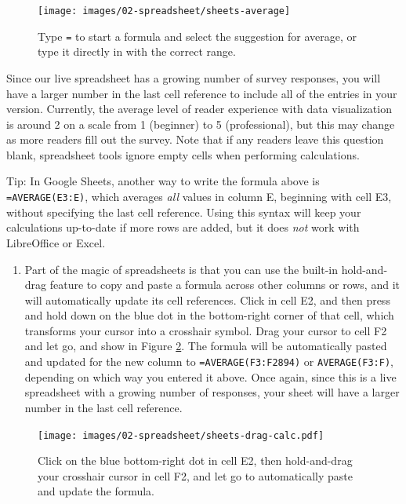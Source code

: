 \documentclass[
  english,
]{book}
\providecommand{\tightlist}{%
  \setlength{\itemsep}{0pt}\setlength{\parskip}{0pt}}
\begin{document}
\begin{figure}
\texttt{[image: images/02-spreadsheet/sheets-average]} \caption{Type \texttt{=} to start a formula and select the suggestion for average, or type it directly in with the correct range.}\label{fig:sheets-average}
\end{figure}

Since our live spreadsheet has a growing number of survey responses, you will have a larger number in the last cell reference to include all of the entries in your version. Currently, the average level of reader experience with data visualization is around 2 on a scale from 1 (beginner) to 5 (professional), but this may change as more readers fill out the survey. Note that if any readers leave this question blank, spreadsheet tools ignore empty cells when performing calculations.

Tip: In Google Sheets, another way to write the formula above is \texttt{=AVERAGE(E3:E)}, which averages \emph{all} values in column E, beginning with cell E3, without specifying the last cell reference. Using this syntax will keep your calculations up-to-date if more rows are added, but it does \emph{not} work with LibreOffice or Excel.

\begin{enumerate}
\def\labelenumi{\arabic{enumi}.}
\setcounter{enumi}{4}
\tightlist
\item
  Part of the magic of spreadsheets is that you can use the built-in hold-and-drag feature to copy and paste a formula across other columns or rows, and it will automatically update its cell references. Click in cell E2, and then press and hold down on the blue dot in the bottom-right corner of that cell, which transforms your cursor into a crosshair symbol. Drag your cursor to cell F2 and let go, and show in Figure \ref{fig:sheets-drag-calc}. The formula will be automatically pasted and updated for the new column to \texttt{=AVERAGE(F3:F2894)} or \texttt{AVERAGE(F3:F)}, depending on which way you entered it above. Once again, since this is a live spreadsheet with a growing number of responses, your sheet will have a larger number in the last cell reference.
\end{enumerate}



\begin{figure}
\centering
\texttt{[image: images/02-spreadsheet/sheets-drag-calc.pdf]}
\caption{\label{fig:sheets-drag-calc}Click on the blue bottom-right dot in cell E2, then hold-and-drag your crosshair cursor in cell F2, and let go to automatically paste and update the formula.}
\end{figure}
\end{document}
